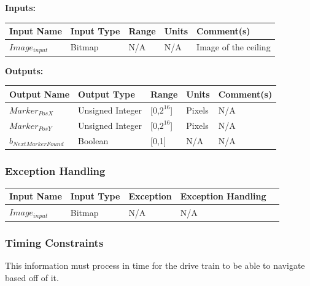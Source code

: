 \documentclass [10pt]{article}
\begin{document}
\textbf{Inputs: } \\

\begin{longtable}{|l|l|l|l|l|}\hline 
	\rowcolor{tableCell}\textbf{Input Name} & \textbf{Input Type} & \textbf{Range} & \textbf{Units} & \textbf{Comment(s)} \\ \hline
	 $ Image_{input} $ & Bitmap &  N/A & N/A & Image of the ceiling  \\ \hline
\end{longtable}

\textbf{Outputs: } \\

\begin{longtable}{|l|l|l|l|l|}\hline 
	\rowcolor{tableCell}\textbf{Output Name} & \textbf{Output Type} & \textbf{Range} & \textbf{Units} & \textbf{Comment(s)} \\ \hline
	$ Marker_{PosX} $ & Unsigned Integer & [0,$2^{16}$] & Pixels &  N/A\\ \hline
	\rowcolor{tableCell}$ Marker_{PosY} $ & Unsigned Integer & [0,$2^{16}$] & Pixels & N/A\\ \hline
	$ b_{NextMarkerFound} $ & Boolean & [0,1] & N/A & N/A\\ \hline
\end{longtable}

\subsubsection{Exception Handling}

\begin{longtable}{|l|l|l|l|l|}\hline 
	\rowcolor{tableCell}\textbf{Input Name} & \textbf{Input Type} & \textbf{Exception} & \textbf{Exception Handling} \\ \hline
	 $ Image_{input} $ & Bitmap &  N/A & N/A \\ \hline
\end{longtable}


\subsubsection{Timing Constraints}
This information must process in time for the drive train to be able to navigate based off of it.
\end{document}
